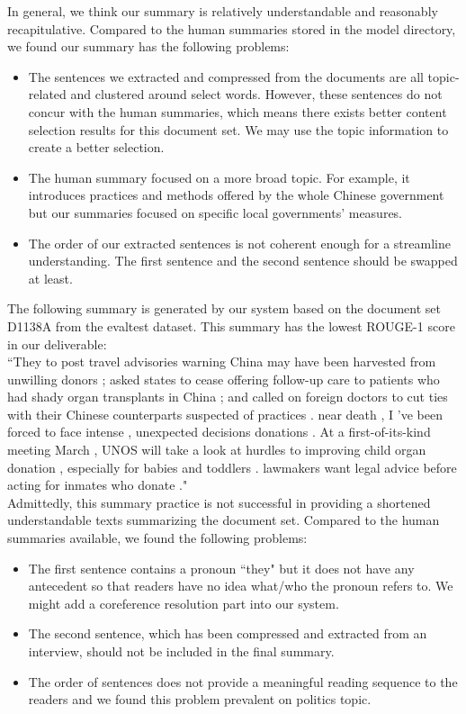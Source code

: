 \documentclass[11pt]{article}
\begin{document}
In general, we think our summary is relatively understandable and reasonably recapitulative. Compared to the human summaries stored in the model directory, we found our summary has the following problems:

\begin{itemize}  
\item The sentences we extracted and compressed from the documents are all topic-related and clustered around select words. However, these sentences do not concur with the human summaries, which means there exists better content selection results for this document set. We may use the topic information to create a better selection.
\item The human summary focused on a more broad topic. For example, it introduces practices and methods offered by the whole Chinese government but our summaries focused on specific local governments' measures.
\item The order of our extracted sentences is not coherent enough for a streamline understanding. The first sentence and the second sentence should be swapped at least.
\end{itemize}

The following summary is generated by our system based on the document set D1138A from the evaltest dataset. This summary has the lowest ROUGE-1 score in our deliverable:\\

``They to post travel advisories warning China may have been harvested from unwilling donors ; asked states to cease offering follow-up care to patients who had shady organ transplants in China ; and called on foreign doctors to cut ties with their Chinese counterparts suspected of practices .
near death , I 've been forced to face intense , unexpected decisions donations .
At a first-of-its-kind meeting March , UNOS will take a look at hurdles to improving child organ donation , especially for babies and toddlers .
lawmakers want legal advice before acting for inmates who donate ."\\

Admittedly, this summary practice is not successful in providing a shortened understandable texts summarizing the document set. Compared to the human summaries available, we found the following problems:
\begin{itemize}
\item The first sentence contains a pronoun ``they" but it does not have any antecedent so that readers have no idea what/who the pronoun refers to. We might add a coreference resolution part into our system.
\item The second sentence, which has been compressed and extracted from an interview, should not be included in the final summary.
\item The order of sentences does not provide a meaningful reading sequence to the readers and we found this problem prevalent on politics topic.
\end{itemize}
\end{document}
